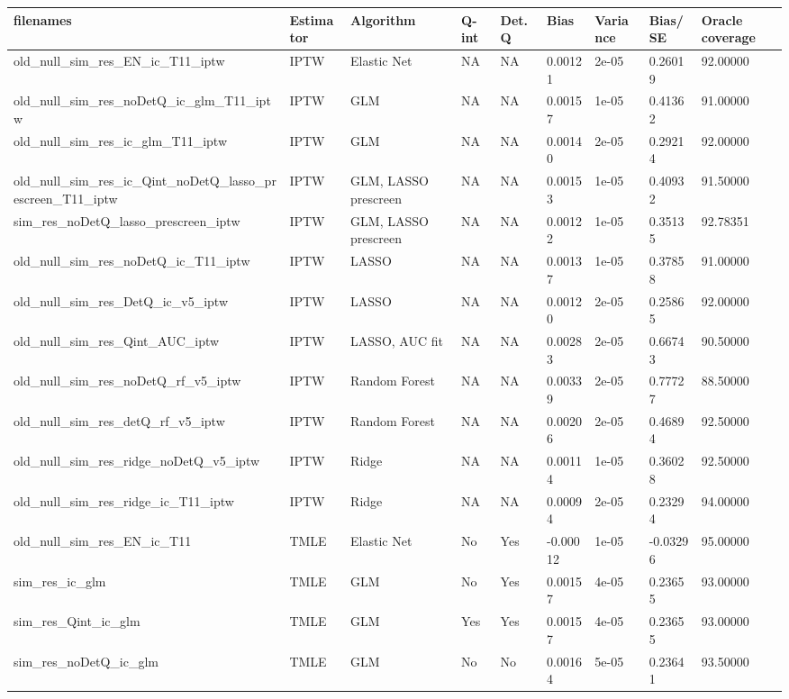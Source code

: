 
\begin{longtable}[l]{lllllllll}
\toprule
filenames & Estimator & Algorithm & Q-int & Det. Q & Bias & Variance & Bias/SE & Oracle coverage\\
\midrule
old\_null\_sim\_res\_EN\_ic\_T11\_iptw & IPTW & Elastic Net & NA & NA & 0.00121 & 2e-05 & 0.26019 & 92.00000\\
old\_null\_sim\_res\_noDetQ\_ic\_glm\_T11\_iptw & IPTW & GLM & NA & NA & 0.00157 & 1e-05 & 0.41362 & 91.00000\\
old\_null\_sim\_res\_ic\_glm\_T11\_iptw & IPTW & GLM & NA & NA & 0.00140 & 2e-05 & 0.29214 & 92.00000\\
old\_null\_sim\_res\_ic\_Qint\_noDetQ\_lasso\_prescreen\_T11\_iptw & IPTW & GLM, LASSO prescreen & NA & NA & 0.00153 & 1e-05 & 0.40932 & 91.50000\\
sim\_res\_noDetQ\_lasso\_prescreen\_iptw & IPTW & GLM, LASSO prescreen & NA & NA & 0.00122 & 1e-05 & 0.35135 & 92.78351\\
old\_null\_sim\_res\_noDetQ\_ic\_T11\_iptw & IPTW & LASSO & NA & NA & 0.00137 & 1e-05 & 0.37858 & 91.00000\\
old\_null\_sim\_res\_DetQ\_ic\_v5\_iptw & IPTW & LASSO & NA & NA & 0.00120 & 2e-05 & 0.25865 & 92.00000\\
old\_null\_sim\_res\_Qint\_AUC\_iptw & IPTW & LASSO, AUC fit & NA & NA & 0.00283 & 2e-05 & 0.66743 & 90.50000\\
old\_null\_sim\_res\_noDetQ\_rf\_v5\_iptw & IPTW & Random Forest & NA & NA & 0.00339 & 2e-05 & 0.77727 & 88.50000\\
old\_null\_sim\_res\_detQ\_rf\_v5\_iptw & IPTW & Random Forest & NA & NA & 0.00206 & 2e-05 & 0.46894 & 92.50000\\
old\_null\_sim\_res\_ridge\_noDetQ\_v5\_iptw & IPTW & Ridge & NA & NA & 0.00114 & 1e-05 & 0.36028 & 92.50000\\
old\_null\_sim\_res\_ridge\_ic\_T11\_iptw & IPTW & Ridge & NA & NA & 0.00094 & 2e-05 & 0.23294 & 94.00000\\
old\_null\_sim\_res\_EN\_ic\_T11 & TMLE & Elastic Net & No & Yes & -0.00012 & 1e-05 & -0.03296 & 95.00000\\
sim\_res\_ic\_glm & TMLE & GLM & No & Yes & 0.00157 & 4e-05 & 0.23655 & 93.00000\\
sim\_res\_Qint\_ic\_glm & TMLE & GLM & Yes & Yes & 0.00157 & 4e-05 & 0.23655 & 93.00000\\
sim\_res\_noDetQ\_ic\_glm & TMLE & GLM & No & No & 0.00164 & 5e-05 & 0.23641 & 93.50000\\

\end{longtable}

